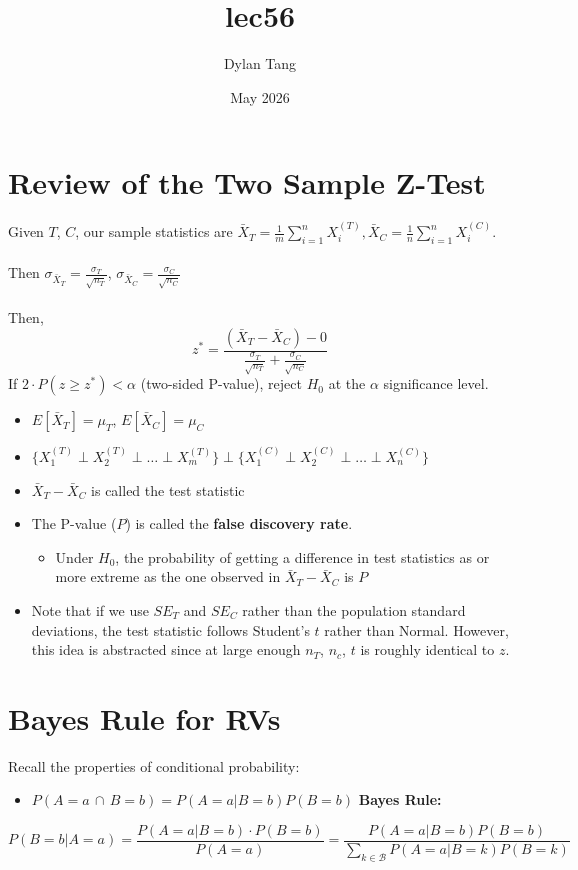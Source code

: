 \documentclass{article}
\title{lec56}
\author{Dylan Tang}
\date{May 2026}
\begin{document}
\maketitle

\section{Review of the Two Sample Z-Test}
Given $T$, $C$, our sample statistics are $\bar{X}_T = \frac{1}{m}\sum_{i=1}^nX_i^{(T)}, \bar{X}_C = \frac{1}{n}\sum_{i=1}^nX_i^{(C)}$.
\\
\\
Then $\sigma_{\bar{X}_T} = \frac{\sigma_T}{\sqrt {n_T}}$, $\sigma_{\bar{X}_C} = \frac{\sigma_C}{\sqrt {n_C}}$
\\
\\
Then,
\[
    z^* = \frac{(\bar{X}_T - \bar{X}_C) - 0}{\frac{\sigma_T}{\sqrt {n_T}} + \frac{\sigma_C}{\sqrt {n_C}}}
\]
If $2 \cdot P(z \geq z^*) < \alpha$ (two-sided P-value), reject $H_0$ at the $\alpha$ significance level.
\begin{itemize}
    \item $E[\bar{X}_T] = \mu_T$, $E[\bar{X}_C] = \mu_C$
    \item $\{X_1^{(T)} \perp X_2^{(T)} \perp \dots \perp X_m^{(T)}\} \perp \{X_1^{(C)} \perp X_2^{(C)} \perp \dots \perp X_n^{(C)}\}$
    \item $\bar{X}_T - \bar{X}_C$ is called the test statistic
    \item The P-value ($P$) is called the \textbf{false discovery rate}.
    \begin{itemize}
        \item Under $H_0$, the probability of getting a difference in test statistics as or more extreme as the one observed in $\bar{X}_T - \bar{X}_C$ is $P$
    \end{itemize}
    \item Note that if we use $SE_T$ and $SE_C$ rather than the population standard deviations, the test statistic follows Student's $t$ rather than Normal. However, this idea is abstracted since at large enough $n_T$, $n_c$, $t$ is roughly identical to $z$.
\end{itemize}
\section{Bayes Rule for RVs}
Recall the properties of conditional probability:
\begin{itemize}
    \item $P(A = a \, \cap \, B = b ) = P(A = a|B = b)P(B = b)$
\newpage
\textbf{Bayes Rule:}
\end{itemize}
\[
    P(B=b|A=a) = \frac{P(A=a|B=b)\cdot P(B=b)}{P(A=a)} = \frac{P(A=a|B=b)P(B=b)}{\sum_{k \in \mathcal{B}}P(A=a|B=k)P(B=k)}
\]
\end{document}
